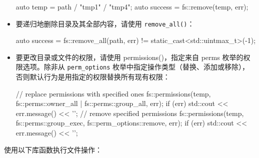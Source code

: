 \begin{itemize}
\begin{cpp}
auto temp = path / "tmp1" / "tmp4";
auto success = fs::remove(temp, err);
\end{cpp}

\item
要递归地删除目录及其全部内容，请使用 \verb|remove_all()|：

\begin{cpp}
auto success = fs::remove_all(path, err) !=
               static_cast<std::uintmax_t>(-1);
\end{cpp}

\item
要更改目录或文件的权限，请使用 permissions()，指定来自 perms 枚举的权限选项。除非从 \verb|perm_options| 枚举中指定操作类型（替换、添加或移除），否则默认行为是用指定的权限替换所有现有权限：

\begin{cpp}
// replace permissions with specified ones
fs::permissions(temp, fs::perms::owner_all |
                      fs::perms::group_all, err);
if (err) std::cout << err.message() << '\n';
// remove specified permissions
fs::permissions(temp, fs::perms::group_exec,
                      fs::perm_options::remove, err);
if (err) std::cout << err.message() << '\n';
\end{cpp}
\end{itemize}

使用以下库函数执行文件操作：

